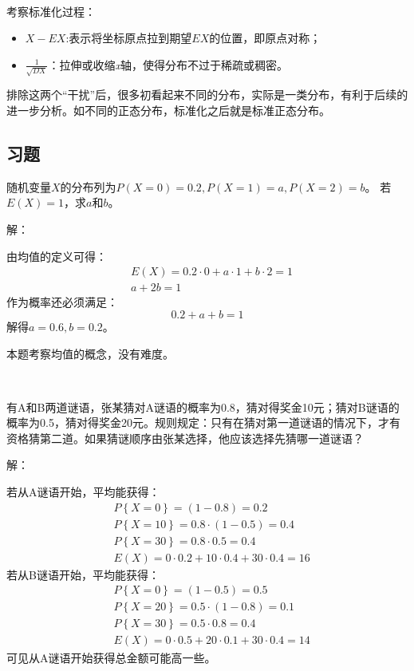 ~

考察标准化过程：
\begin{itemize}
    \item $X-EX$:表示将坐标原点拉到期望$EX$的位置，即原点对称；
    \item $\frac{1}{\sqrt{DX}}$：拉伸或收缩{\it x}轴，使得分布不过于稀疏或稠密。
\end{itemize}
排除这两个“干扰”后，很多初看起来不同的分布，实际是一类分布，有利于后续的进一步分析。如不同的正态分布，标准化之后就是标准正态分布。

\subsection{习题}

\begin{example}
随机变量$X$的分布列为$P\left( X=0 \right) =0.2,P\left( X=1 \right) =a,P\left( X=2 \right) =b$。
若$E\left( X \right) =1$，求$a$和$b$。
\end{example}

解：

由均值的定义可得：
\begin{align*}
&E\left( X \right) =0.2\cdot 0+a\cdot 1+b\cdot 2=1 \\
&a+2b=1
\end{align*}
作为概率还必须满足：
\[
0.2+a+b=1
\]
解得$a=0.6,b=0.2$。

\begin{tcolorbox}
本题考察均值的概念，没有难度。
\end{tcolorbox}

~

\begin{example}
有A和B两道谜语，张某猜对A谜语的概率为0.8，猜对得奖金10元；猜对B谜语的概率为0.5，猜对得奖金20元。规则规定：只有在猜对第一道谜语的情况下，才有资格猜第二道。如果猜谜顺序由张某选择，他应该选择先猜哪一道谜语？
\end{example}

解：

若从A谜语开始，平均能获得：
\begin{align*}
&P\left\{ X=0 \right\} =\left( 1-0.8 \right) =0.2 \\
&P\left\{ X=10 \right\} =0.8\cdot \left( 1-0.5 \right) =0.4 \\
&P\left\{ X=30 \right\} =0.8\cdot 0.5=0.4 \\
&E\left( X \right) =0\cdot 0.2+10\cdot 0.4+30\cdot 0.4=16
\end{align*}
若从B谜语开始，平均能获得：
\begin{align*}
&P\left\{ X=0 \right\} =\left( 1-0.5 \right) =0.5 \\
&P\left\{ X=20 \right\} =0.5\cdot \left( 1-0.8 \right) =0.1 \\
&P\left\{ X=30 \right\} =0.5\cdot 0.8=0.4 \\
&E\left( X \right) =0\cdot 0.5+20\cdot 0.1+30\cdot 0.4=14
\end{align*}
可见从A谜语开始获得总金额可能高一些。

